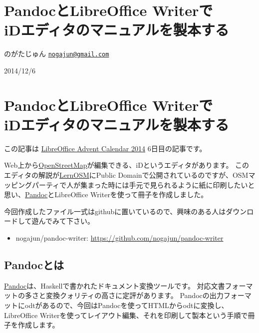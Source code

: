 \documentclass[]{article}
\date{}
\providecommand{\tightlist}{%
  \setlength{\itemsep}{0pt}\setlength{\parskip}{0pt}}
\begin{document}
\section{\texorpdfstring{PandocとLibreOffice Writerで\\
iDエディタのマニュアルを製本する}{PandocとLibreOffice Writerで iDエディタのマニュアルを製本する}}\label{pandocux3068libreoffice-writerux3067-idux30a8ux30c7ux30a3ux30bfux306eux30deux30cbux30e5ux30a2ux30ebux3092ux88fdux672cux3059ux308b}

のがたじゅん
\href{mailto:nogajun@gmail.com}{\nolinkurl{nogajun@gmail.com}}

2014/12/6

\section{\texorpdfstring{PandocとLibreOffice Writerで\\
iDエディタのマニュアルを製本する}{PandocとLibreOffice Writerで iDエディタのマニュアルを製本する}}\label{pandocux3068libreoffice-writerux3067-idux30a8ux30c7ux30a3ux30bfux306eux30deux30cbux30e5ux30a2ux30ebux3092ux88fdux672cux3059ux308b-1}

この記事は \href{http://www.adventar.org/calendars/507}{LibreOffice
Advent Calendar 2014} 6日目の記事です。

Web上から\href{http://www.openstreetmap.org/}{OpenStreetMap}が編集できる、iDというエディタがあります。
このエディタの解説が\href{http://learnosm.org/jp/}{LernOSM}にPublic
Domainで公開されているのですが、OSMマッピングパーティで人が集まった時には手元で見られるように紙に印刷したいと思い、\href{http://johnmacfarlane.net/pandoc/}{Pandoc}とLibreOffice
Writerを使って冊子を作成しました。

今回作成したファイル一式はgithubに置いているので、興味のある人はダウンロードして遊んでみて下さい。

\begin{itemize}
\tightlist
\item
  nogajun/pandoc-writer: \url{https://github.com/nogajun/pandoc-writer}
\end{itemize}

\subsection{Pandocとは}\label{pandocux3068ux306f}

\href{http://johnmacfarlane.net/pandoc/}{Pandoc}は、Haskellで書かれたドキュメント変換ツールです。
対応文書フォーマットの多さと変換クォリティの高さに定評があります。
Pandocの出力フォーマットにodtがあるので、今回はPandocを使ってHTMLからodtに変換し、LibreOffice
Writerを使ってレイアウト編集、それを印刷して製本という手順で冊子を作成します。
\end{document}
